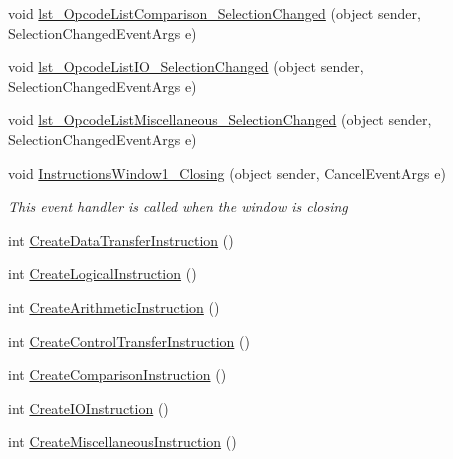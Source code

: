 \begin{DoxyCompactItemize}
\item 
void \hyperlink{class_c_p_u___o_s___simulator_1_1_instructions_window_a2533f28aaeacd5ef8b931670e9716e1f}{lst\+\_\+\+Opcode\+List\+Comparison\+\_\+\+Selection\+Changed} (object sender, Selection\+Changed\+Event\+Args e)
\item 
void \hyperlink{class_c_p_u___o_s___simulator_1_1_instructions_window_a48ff23d2cce66f2bb2c5219fabfb7f9b}{lst\+\_\+\+Opcode\+List\+I\+O\+\_\+\+Selection\+Changed} (object sender, Selection\+Changed\+Event\+Args e)
\item 
void \hyperlink{class_c_p_u___o_s___simulator_1_1_instructions_window_aec022b9a8b3fb4d538f674336275dd81}{lst\+\_\+\+Opcode\+List\+Miscellaneous\+\_\+\+Selection\+Changed} (object sender, Selection\+Changed\+Event\+Args e)
\item 
void \hyperlink{class_c_p_u___o_s___simulator_1_1_instructions_window_ac5b4dea0d3fe645b7f0bf9201cb0ad1c}{Instructions\+Window1\+\_\+\+Closing} (object sender, Cancel\+Event\+Args e)
\begin{DoxyCompactList}\small\item\em This event handler is called when the window is closing \end{DoxyCompactList}\item 
int \hyperlink{class_c_p_u___o_s___simulator_1_1_instructions_window_abe4b97375077fb5bfe686b84fd2a7b77}{Create\+Data\+Transfer\+Instruction} ()
\item 
int \hyperlink{class_c_p_u___o_s___simulator_1_1_instructions_window_a3511269feda0bd105c495efef59bbfdd}{Create\+Logical\+Instruction} ()
\item 
int \hyperlink{class_c_p_u___o_s___simulator_1_1_instructions_window_a1d375720d3132849a446bbfb2b3507c5}{Create\+Arithmetic\+Instruction} ()
\item 
int \hyperlink{class_c_p_u___o_s___simulator_1_1_instructions_window_a93f0cc6a87afcac6e2d579c6a95a1e91}{Create\+Control\+Transfer\+Instruction} ()
\item 
int \hyperlink{class_c_p_u___o_s___simulator_1_1_instructions_window_af33b0726386a647d00bfd7ab3a7b3450}{Create\+Comparison\+Instruction} ()
\item 
int \hyperlink{class_c_p_u___o_s___simulator_1_1_instructions_window_a27c3db79ebda29b7aee40c735df07b04}{Create\+I\+O\+Instruction} ()
\item 
int \hyperlink{class_c_p_u___o_s___simulator_1_1_instructions_window_af4fcd7a0d54d2cfcdf44a209eefa7d93}{Create\+Miscellaneous\+Instruction} ()
\item 

\end{DoxyCompactItemize}

